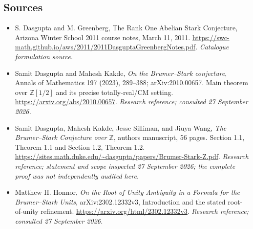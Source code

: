 \documentclass[11pt,a4paper]{article}
\newcommand{\Z}{\mathbb{Z}}
\numberwithin{equation}{section}
\begin{document}
\subsection{Sources}
\begin{itemize}\raggedright
\item[\textnormal{[S1]}]\hypertarget{source:30001846:1}{} S. Dasgupta and M. Greenberg, The Rank One Abelian Stark Conjecture, Arizona Winter School 2011 course notes, March 11, 2011.
\url{https://swc-math.github.io/aws/2011/2011DasguptaGreenbergNotes.pdf}.
{\small\textit{Catalogue formulation source.}}
\item[\textnormal{[E1]}]\hypertarget{extra:30001846:1}{} Samit Dasgupta and Mahesh Kakde, \emph{On the Brumer--Stark conjecture}, Annals of Mathematics 197 (2023), 289--388; arXiv:2010.00657. Main theorem over $\Z[1/2]$ and its precise totally-real/CM setting.
\url{https://arxiv.org/abs/2010.00657}.
{\small\textit{Research reference; consulted 27 September 2026.}}
\item[\textnormal{[E2]}]\hypertarget{extra:30001846:2}{} Samit Dasgupta, Mahesh Kakde, Jesse Silliman, and Jiuya Wang, \emph{The Brumer--Stark Conjecture over $\Z$}, authors\textquotesingle{} manuscript, 56 pages. Section 1.1, Theorem 1.1 and Section 1.2, Theorem 1.2.
\url{https://sites.math.duke.edu/~dasgupta/papers/Brumer-Stark-Z.pdf}.
{\small\textit{Research reference; statement and scope inspected 27 September 2026; the complete proof was not independently audited here.}}
\item[\textnormal{[E3]}]\hypertarget{extra:30001846:3}{} Matthew H. Honnor, \emph{On the Root of Unity Ambiguity in a Formula for the Brumer--Stark Units}, arXiv:2302.12332v3, Introduction and the stated root-of-unity refinement.
\url{https://arxiv.org/html/2302.12332v3}.
{\small\textit{Research reference; consulted 27 September 2026.}}
\end{itemize}
\end{document}
